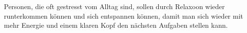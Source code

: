 
Personen, die oft gestresst vom Alltag sind, sollen durch Relaxoon wieder runterkommen können
und sich entspannen können, damit man sich wieder mit mehr Energie und einem klaren Kopf den
nächsten Aufgaben stellen kann.


